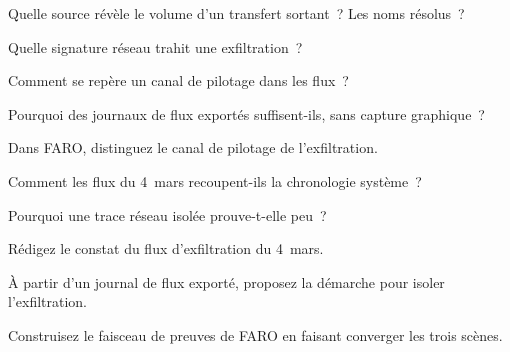 \bigskip

\begin{boxexo}[title={\ding{45}\quad Exercice~14.1. Sources \niveaubase}]
Quelle source révèle le volume d'un transfert sortant~? Les noms résolus~?
\end{boxexo}

\begin{boxexo}[title={\ding{45}\quad Exercice~14.2. Exfiltration \niveaubase}]
Quelle signature réseau trahit une exfiltration~?
\end{boxexo}

\begin{boxexo}[title={\ding{45}\quad Exercice~14.3. Pilotage \niveaubase}]
Comment se repère un canal de pilotage dans les flux~?
\end{boxexo}

\begin{boxexo}[title={\ding{45}\quad Exercice~14.4. Sans capture \niveaumoyen}]
Pourquoi des journaux de flux exportés suffisent-ils, sans capture graphique~?
\end{boxexo}

\begin{boxexo}[title={\ding{45}\quad Exercice~14.5. FARO \niveaumoyen}]
Dans FARO, distinguez le canal de pilotage de l'exfiltration.
\end{boxexo}

\begin{boxexo}[title={\ding{45}\quad Exercice~14.6. Recouper \niveaumoyen}]
Comment les flux du 4~mars recoupent-ils la chronologie système~?
\end{boxexo}

\begin{boxexo}[title={\ding{45}\quad Exercice~14.7. Faisceau \niveaumoyen}]
Pourquoi une trace réseau isolée prouve-t-elle peu~?
\end{boxexo}

\begin{boxexo}[title={\ding{45}\quad Exercice~14.8. Constat réseau \niveaumoyen}]
Rédigez le constat du flux d'exfiltration du 4~mars.
\end{boxexo}

\begin{boxexo}[title={\ding{45}\quad Exercice~14.9. Analyse de flux \niveauexpert}]
À partir d'un journal de flux exporté, proposez la démarche pour isoler
l'exfiltration.
\end{boxexo}

\begin{boxexo}[title={\ding{45}\quad Exercice~14.10. Convergence \niveauexpert}]
Construisez le faisceau de preuves de FARO en faisant converger les trois
scènes.
\end{boxexo}

